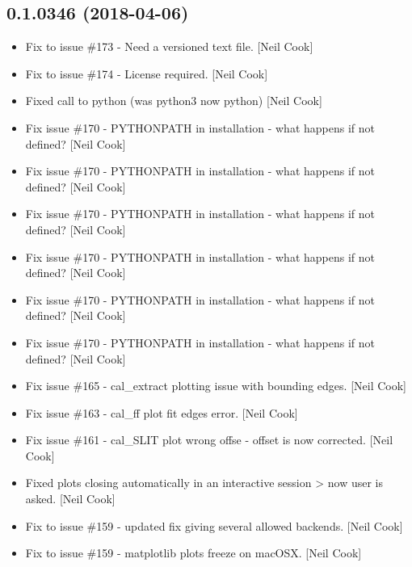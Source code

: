 \documentclass[a4paper,10pt,english]{report}
\begin{document}
\subsection{0.1.0346 (2018-04-06)}
\label{\detokenize{misc/changelog:id465}}\begin{itemize}
\item {} 
Fix to issue \#173 - Need a versioned text file. {[}Neil Cook{]}

\item {} 
Fix to issue \#174 - License required. {[}Neil Cook{]}

\item {} 
Fixed call to python (was python3 now python) {[}Neil Cook{]}

\item {} 
Fix issue \#170 - PYTHONPATH in installation - what happens if not
defined? {[}Neil Cook{]}

\item {} 
Fix issue \#170 - PYTHONPATH in installation - what happens if not
defined? {[}Neil Cook{]}

\item {} 
Fix issue \#170 - PYTHONPATH in installation - what happens if not
defined? {[}Neil Cook{]}

\item {} 
Fix issue \#170 - PYTHONPATH in installation - what happens if not
defined? {[}Neil Cook{]}

\item {} 
Fix issue \#170 - PYTHONPATH in installation - what happens if not
defined? {[}Neil Cook{]}

\item {} 
Fix issue \#170 - PYTHONPATH in installation - what happens if not
defined? {[}Neil Cook{]}

\item {} 
Fix issue \#165 - cal\_extract plotting issue with bounding edges. {[}Neil
Cook{]}

\item {} 
Fix issue \#163 - cal\_ff plot fit edges error. {[}Neil Cook{]}

\item {} 
Fix issue \#161 - cal\_SLIT plot wrong offse - offset is now corrected.
{[}Neil Cook{]}

\item {} 
Fixed plots closing automatically in an interactive session \textendash{}\textgreater{} now
user is asked. {[}Neil Cook{]}

\item {} 
Fix to issue \#159 - updated fix giving several allowed backends. {[}Neil
Cook{]}

\item {} 
Fix to issue \#159 - matplotlib plots freeze on macOSX. {[}Neil Cook{]}

\end{itemize}
\end{document}
